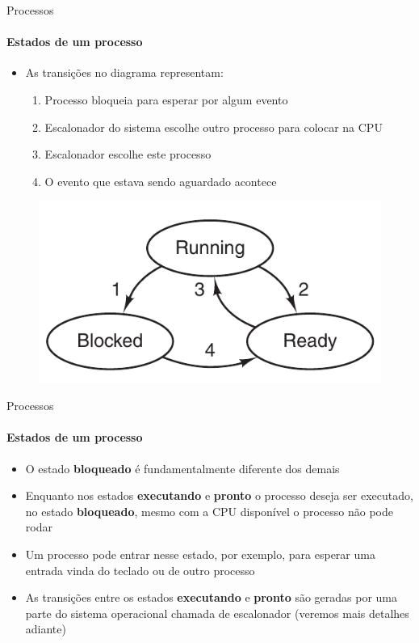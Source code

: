 \documentclass{beamer}
\begin{document}
\begin{frame}{Processos}
	\framesubtitle{Estados de um processo}
	\begin{itemize}
		\item As transições no diagrama representam:
		\begin{enumerate}
			\item Processo bloqueia para esperar por algum evento
			\item Escalonador do sistema escolhe outro processo para colocar na CPU
			\item Escalonador escolhe este processo
			\item O evento que estava sendo aguardado acontece
		\end{enumerate}
	\end{itemize}
	\begin{figure}
		\includegraphics[width=0.5\paperwidth]{resources/states}
	\end{figure}
\end{frame}
\begin{frame}{Processos}
	\framesubtitle{Estados de um processo}
	\begin{itemize}
		\item O estado \textbf{bloqueado} é fundamentalmente diferente dos demais
		\item Enquanto nos estados \textbf{executando} e \textbf{pronto} o processo deseja ser executado, no estado \textbf{bloqueado}, mesmo com a CPU disponível o processo não pode rodar
		\item Um processo pode entrar nesse estado, por exemplo, para esperar uma entrada vinda do teclado ou de outro processo
		\item As transições entre os estados \textbf{executando} e \textbf{pronto} são geradas por uma parte do sistema operacional chamada de \alert{escalonador} (veremos mais detalhes adiante)
	\end{itemize}
\end{frame}
\end{document}
